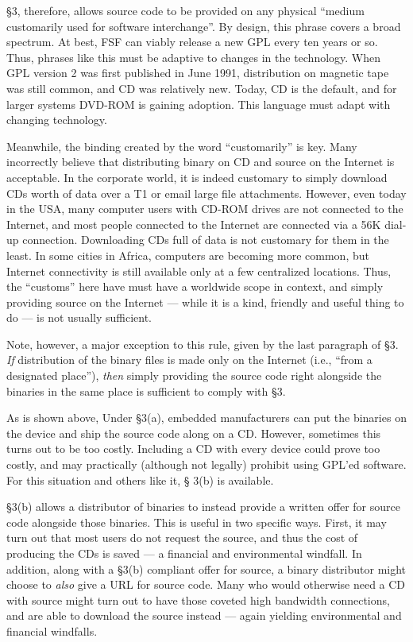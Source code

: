 \documentclass[12pt]{report}
\begin{document}
\S 3, therefore, allows source code to be provided on any physical
``medium customarily used for software interchange''.  By design, this
phrase covers a broad spectrum.  At best, FSF can viably release a new GPL
every ten years or so.  Thus, phrases like this must be adaptive to
changes in the technology.  When GPL version 2 was first published in June
1991, distribution on magnetic tape was still common, and CD was
relatively new.  Today, CD is the default, and for larger systems DVD-ROM
is gaining adoption.  This language must adapt with changing technology.

Meanwhile, the binding created by the word ``customarily'' is key.  Many
incorrectly believe that distributing binary on CD and source on the
Internet is acceptable.  In the corporate world, it is indeed customary to
simply download CDs worth of data over a T1 or email large file
attachments.  However, even today in the USA, many computer users with
CD-ROM drives are not connected to the Internet, and most people connected
to the Internet are connected via a 56K dial-up connection.  Downloading
CDs full of data is not customary for them in the least.  In some cities
in Africa, computers are becoming more common, but Internet connectivity
is still available only at a few centralized locations.  Thus, the
``customs'' here have must have a worldwide scope in context, and simply
providing source on the Internet --- while it is a kind, friendly and
useful thing to do --- is not usually sufficient.

Note, however, a major exception to this rule, given by the last paragraph
of \S 3.  \emph{If} distribution of the binary files is made only on the
Internet (i.e., ``from a designated place''), \emph{then} simply providing
the source code right alongside the binaries in the same place is
sufficient to comply with \S 3.

\medskip

As is shown above, Under \S 3(a), embedded manufacturers can put the
binaries on the device and ship the source code along on a CD\@.  However,
sometimes this turns out to be too costly.  Including a CD with every
device could prove too costly, and may practically (although not legally)
prohibit using GPL'ed software.  For this situation and others like it, \S
3(b) is available.

\S 3(b) allows a distributor of binaries to instead provide a written
offer for source code alongside those binaries.  This is useful in two
specific ways.  First, it may turn out that most users do not request the
source, and thus the cost of producing the CDs is saved --- a financial
and environmental windfall.  In addition, along with a \S 3(b) compliant
offer for source, a binary distributor might choose to \emph{also} give a
URL for source code.  Many who would otherwise need a CD with source might
turn out to have those coveted high bandwidth connections, and are able to
download the source instead --- again yielding environmental and financial
windfalls.
\end{document}
